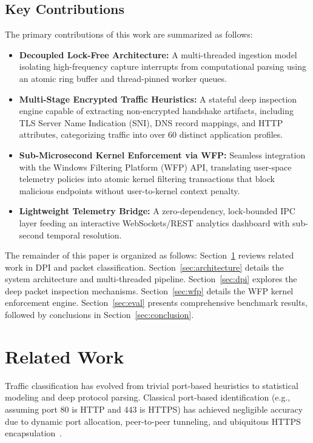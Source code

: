 \documentclass[conference]{IEEEtran}
\begin{document}
\subsection{Key Contributions}
The primary contributions of this work are summarized as follows:
\begin{itemize}
    \item \textbf{Decoupled Lock-Free Architecture:} A multi-threaded ingestion model isolating high-frequency capture interrupts from computational parsing using an atomic ring buffer and thread-pinned worker queues.
    \item \textbf{Multi-Stage Encrypted Traffic Heuristics:} A stateful deep inspection engine capable of extracting non-encrypted handshake artifacts, including TLS Server Name Indication (SNI), DNS record mappings, and HTTP attributes, categorizing traffic into over 60 distinct application profiles.
    \item \textbf{Sub-Microsecond Kernel Enforcement via WFP:} Seamless integration with the Windows Filtering Platform (WFP) API, translating user-space telemetry policies into atomic kernel filtering transactions that block malicious endpoints without user-to-kernel context penalty.
    \item \textbf{Lightweight Telemetry Bridge:} A zero-dependency, lock-bounded IPC layer feeding an interactive WebSockets/REST analytics dashboard with sub-second temporal resolution.
\end{itemize}

The remainder of this paper is organized as follows: Section~\ref{sec:related} reviews related work in DPI and packet classification. Section~\ref{sec:architecture} details the system architecture and multi-threaded pipeline. Section~\ref{sec:dpi} explores the deep packet inspection mechanisms. Section~\ref{sec:wfp} details the WFP kernel enforcement engine. Section~\ref{sec:eval} presents comprehensive benchmark results, followed by conclusions in Section~\ref{sec:conclusion}.

\section{Related Work}
\label{sec:related}
Traffic classification has evolved from trivial port-based heuristics to statistical modeling and deep protocol parsing. Classical port-based identification (e.g., assuming port 80 is HTTP and 443 is HTTPS) has achieved negligible accuracy due to dynamic port allocation, peer-to-peer tunneling, and ubiquitous HTTPS encapsulation~\cite{moore2005internet}.
\end{document}
